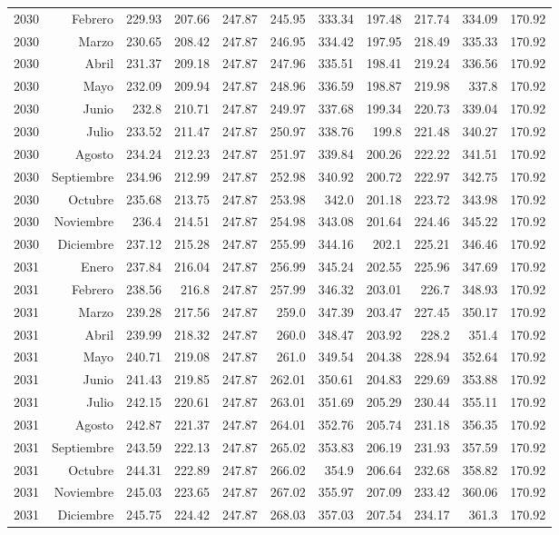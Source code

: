 \documentclass{article}%
\begin{document}
\begin{longtable}{|l r|r|r|r|r|r|r|r|r|r|}
2030&Febrero&229.93&207.66&247.87&245.95&333.34&197.48&217.74&334.09&170.92\\%
2030&Marzo&230.65&208.42&247.87&246.95&334.42&197.95&218.49&335.33&170.92\\%
2030&Abril&231.37&209.18&247.87&247.96&335.51&198.41&219.24&336.56&170.92\\%
2030&Mayo&232.09&209.94&247.87&248.96&336.59&198.87&219.98&337.8&170.92\\%
2030&Junio&232.8&210.71&247.87&249.97&337.68&199.34&220.73&339.04&170.92\\%
2030&Julio&233.52&211.47&247.87&250.97&338.76&199.8&221.48&340.27&170.92\\%
2030&Agosto&234.24&212.23&247.87&251.97&339.84&200.26&222.22&341.51&170.92\\%
2030&Septiembre&234.96&212.99&247.87&252.98&340.92&200.72&222.97&342.75&170.92\\%
2030&Octubre&235.68&213.75&247.87&253.98&342.0&201.18&223.72&343.98&170.92\\%
2030&Noviembre&236.4&214.51&247.87&254.98&343.08&201.64&224.46&345.22&170.92\\%
2030&Diciembre&237.12&215.28&247.87&255.99&344.16&202.1&225.21&346.46&170.92\\%
2031&Enero&237.84&216.04&247.87&256.99&345.24&202.55&225.96&347.69&170.92\\%
2031&Febrero&238.56&216.8&247.87&257.99&346.32&203.01&226.7&348.93&170.92\\%
2031&Marzo&239.28&217.56&247.87&259.0&347.39&203.47&227.45&350.17&170.92\\%
2031&Abril&239.99&218.32&247.87&260.0&348.47&203.92&228.2&351.4&170.92\\%
2031&Mayo&240.71&219.08&247.87&261.0&349.54&204.38&228.94&352.64&170.92\\%
2031&Junio&241.43&219.85&247.87&262.01&350.61&204.83&229.69&353.88&170.92\\%
2031&Julio&242.15&220.61&247.87&263.01&351.69&205.29&230.44&355.11&170.92\\%
2031&Agosto&242.87&221.37&247.87&264.01&352.76&205.74&231.18&356.35&170.92\\%
2031&Septiembre&243.59&222.13&247.87&265.02&353.83&206.19&231.93&357.59&170.92\\%
2031&Octubre&244.31&222.89&247.87&266.02&354.9&206.64&232.68&358.82&170.92\\%
2031&Noviembre&245.03&223.65&247.87&267.02&355.97&207.09&233.42&360.06&170.92\\%
2031&Diciembre&245.75&224.42&247.87&268.03&357.03&207.54&234.17&361.3&170.92\\%

\end{longtable}
\end{document}
